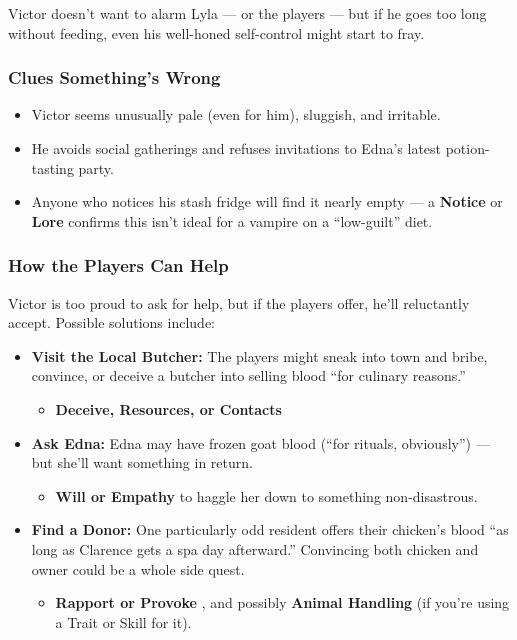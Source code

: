 Victor doesn’t want to alarm Lyla — or the players — but if he goes too long without feeding, even his well-honed self-control might start to fray.

\subsubsection*{Clues Something’s Wrong}
\begin{itemize}
    \item Victor seems unusually pale (even for him), sluggish, and irritable.
    \item He avoids social gatherings and refuses invitations to Edna’s latest potion-tasting party.
    \item Anyone who notices his stash fridge will find it nearly empty — a \textbf{Notice} or \textbf{Lore}  confirms this isn’t ideal for a vampire on a “low-guilt” diet.
\end{itemize}

\subsubsection*{How the Players Can Help}
Victor is too proud to ask for help, but if the players offer, he’ll reluctantly accept. Possible solutions include:

\begin{itemize}
    \item \textbf{Visit the Local Butcher:} The players might sneak into town and bribe, convince, or deceive a butcher into selling blood “for culinary reasons.”
        \begin{itemize}
            \item \textbf{Deceive, Resources, or Contacts} 
        \end{itemize}
    \item \textbf{Ask Edna:} Edna may have frozen goat blood (“for rituals, obviously”) — but she’ll want something in return.
        \begin{itemize}
            \item \textbf{Will or Empathy}  to haggle her down to something non-disastrous.
        \end{itemize}
    \item \textbf{Find a Donor:} One particularly odd resident offers their chicken’s blood “as long as Clarence gets a spa day afterward.” Convincing both chicken and owner could be a whole side quest.
        \begin{itemize}
            \item \textbf{Rapport or Provoke} , and possibly \textbf{Animal Handling} (if you’re using a Trait or Skill for it).
        \end{itemize}
\end{itemize}

